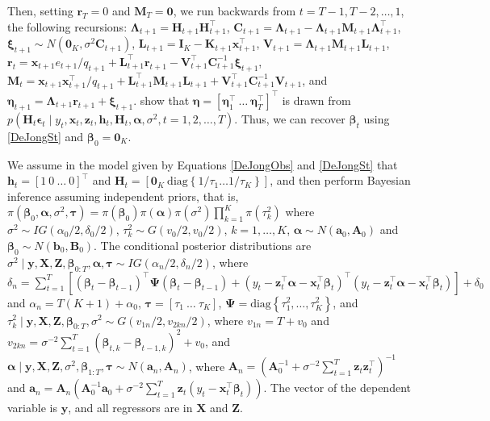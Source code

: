 Then, setting $\bm{r}_T=0$ and $\bm{M}_T=\bm{0}$, we run backwards from $t=T-1, T-2, \dots, 1$, the following recursions: $\bm{\Lambda}_{t+1}=\bm{H}_{t+1}\bm{H}_{t+1}^{\top}$, $\bm{C}_{t+1}=\bm{\Lambda}_{t+1}-\bm{\Lambda}_{t+1}\bm{M}_{t+1}\bm{\Lambda}_{t+1}^{\top}$, $\bm{\xi}_{t+1}\sim N(\bm{0}_K,\sigma^2\bm{C}_{t+1})$, $\bm{L}_{t+1}=\bm{I}_K-\bm{K}_{t+1}\bm{x}_{t+1}^{\top}$, $\bm{V}_{t+1}=\bm{\Lambda}_{t+1}\bm{M}_{t+1}\bm{L}_{t+1}$, $\bm{r}_{t}=\bm{x}_{t+1} e_{t+1}/q_{t+1} + \bm{L}_{t+1}^{\top}\bm{r}_{t+1}-\bm{V}_{t+1}^{\top}\bm{C}_{t+1}^{-1}\bm{\xi}_{t+1}$, $\bm{M}_{t}=\bm{x}_{t+1}\bm{x}_{t+1}^{\top}/q_{t+1}+\bm{L}_{t+1}^{\top}\bm{M}_{t+1}\bm{L}_{t+1}+\bm{V}_{t+1}^{\top}\bm{C}_{t+1}^{-1}\bm{V}_{t+1}$, and $\bm{\eta}_{t+1}=\bm{\Lambda}_{t+1}\bm{r}_{t+1}+\bm{\xi}_{t+1}$. \cite{de1995simulation} show that $\bm{\eta}=[\bm{\eta}_1^{\top} \ \dots \ \bm{\eta}_T^{\top}]^{\top}$ is drawn from $p(\bm{H}_t\bm{\epsilon}_t\mid y_t,\bm{x}_t,\bm{z}_t,\bm{h}_t,\bm{H}_t,\bm{\alpha},\sigma^2, t=1,2,\dots,T)$. Thus, we can recover $\bm{\beta}_t$ using \ref{DeJongSt} and $\bm{\beta}_0=\bm{0}_K$.

We assume in the model given by Equations \ref{DeJongObs} and \ref{DeJongSt} that $\bm{h}_t=[1 \ 0 \ \dots \ 0]^{
\top}$ and $\bm{H}_t=[\bm{0}_K \ \text{diag}\left\{1/\tau_1\dots1/\tau_K\right\}]$, and then perform Bayesian inference assuming independent priors, that is, $\pi(\bm{\beta}_0,\bm{\alpha},\sigma^2,\bm{\tau})=\pi(\bm{\beta}_0)\pi(\bm{\alpha})\pi(\sigma^2)\prod_{k=1}^K\pi(\tau_k^2)$ where $\sigma^2\sim IG(\alpha_0/2,\delta_0/2)$, $\tau_k^2\sim G(v_{0}/2,v_{0}/2)$, $k=1,\dots,K$, $\bm{\alpha}\sim N(\bm{a}_0,\bm{A}_0)$ and $\bm{\beta}_0\sim N(\bm{b}_0,\bm{B}_0)$. The conditional posterior distributions are $\sigma^2\mid \bm{y},\bm{X},\bm{Z},\bm{\beta}_{0:T},\bm{\alpha},\bm{\tau}\sim IG(\alpha_{n}/2,\delta_n/2)$, where $\delta_n=\sum_{t=1}^T\left[(\bm{\beta}_t-\bm{\beta}_{t-1})^{\top}\bm{\Psi}(\bm{\beta}_t-\bm{\beta}_{t-1})+(y_t-\bm{z}_t^{\top}\bm{\alpha}-\bm{x}_t^{\top}\bm{\beta}_t)^{\top}(y_t-\bm{z}_t^{\top}\bm{\alpha}-\bm{x}_t^{\top}\bm{\beta}_t)\right]+\delta_0$ and  $\alpha_{n}=T(K+1)+\alpha_0$, $\bm{\tau}=[\tau_1 \ \dots \ \tau_K]$, $\bm{\Psi}=\text{diag}\left\{\tau_1^2,\dots,\tau_K^2\right\}$, and $\tau_k^2\mid \bm{y},\bm{X},\bm{Z},\bm{\beta}_{0:T},\sigma^2\sim G(v_{1n}/2,v_{2kn}/2)$, where $v_{1n}=T+v_{0}$ and $v_{2kn}=\sigma^{-2}\sum_{t=1}^T(\bm{\beta}_{t,k}-\bm{\beta}_{t-1,k})^2+v_{0}$, and $\bm{\alpha}\mid \bm{y},\bm{X},\bm{Z},\sigma^2,\bm{\beta}_{1:T},\bm{\tau}\sim N(\bm{a}_n,\bm{A}_n)$, where $\bm{A}_n=(\bm{A}_0^{-1}+\sigma^{-2}\sum_{t=1}^T\bm{z}_t\bm{z}_t^{\top})^{-1}$ and $\bm{a}_n=\bm{A}_n(\bm{A}_0^{-1}\bm{a}_0+\sigma^{-2}\sum_{t=1}^T\bm{z}_t(y_t-\bm{x}_t^{\top}\bm{\beta}_t))$. The vector of the dependent variable is $\bm{y}$, and all regressors are in $\bm{X}$ and $\bm{Z}$.

